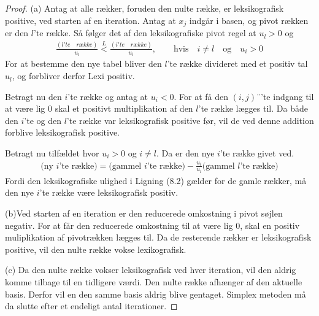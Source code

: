 \begin{proof}
(a) Antag at alle rækker, foruden den nulte række, er leksikografisk positive, ved starten af en iteration. Antag at $x_j$ indgår i basen, og pivot rækken er den $l$'te række. Så følger det af den leksikografiske pivot regel at $u_l>0$ og
\begin{align}
\frac{(l'te \quad række)}{u_l} \overset{L}{<} \frac{(i'te \quad række)}{u_i}, \quad \quad \text{hvis} \quad  i \neq l \quad \text{og} \quad u_i>0
\end{align}
For at bestemme den nye tabel bliver den $l$'te række divideret med et positiv tal $u_l$, og forbliver derfor Lexi positiv. 

Betragt nu den $i$'te række og antag at $u_i<0$. For at få den $(i,j)$¨'te indgang til at være lig $0$ skal et positivt multiplikation af den $l$'te række lægges til. Da både den $i$'te og den $l$'te række var leksikografisk positive før, vil de ved denne addition forblive leksikografisk positive.

Betragt nu tilfældet hvor $u_i>0$ og $i \neq l$. Da er den nye $i$'te række givet ved. 
\begin{align*}
(\text{ny $i$'te række)}=\text{(gammel $i$'te række)}-\frac{u_i}{u_l}\text{(gammel $l$'te række)}
\end{align*}  
Fordi den leksikografiske ulighed i Ligning (8.2) gælder for de gamle rækker, må den nye $i$'te række være leksikografisk positiv. 

(b)Ved starten af en iteration er den reducerede omkostning i pivot søjlen negativ. For at får den reducerede omkostning til at være lig $0$, skal en positiv muliplikation af pivotrækken lægges til. Da de resterende rækker er leksikografisk positive, vil den nulte række vokse lexikografisk. 


(c) Da den nulte række vokser leksikografisk ved hver iteration, vil den aldrig komme tilbage til en tidligere værdi. Den nulte række afhænger af den aktuelle basis. Derfor vil en den samme basis aldrig blive gentaget. Simplex metoden må da slutte efter et endeligt antal iterationer. 
\end{proof}

